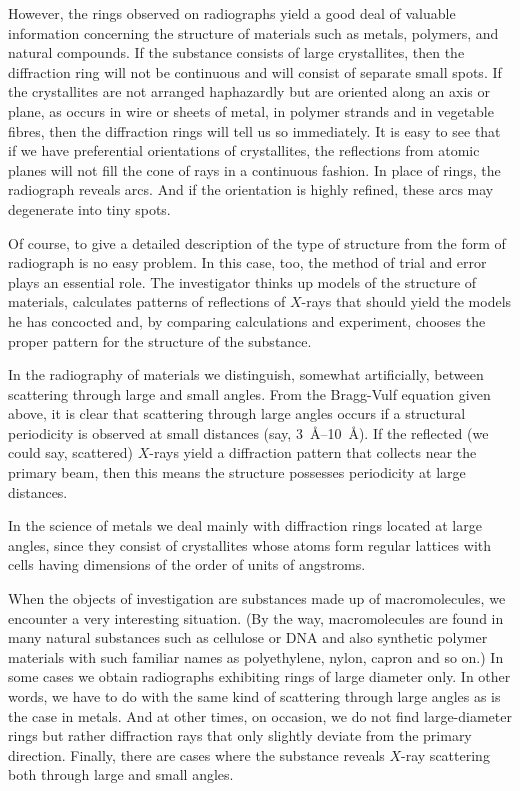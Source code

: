 However, the rings observed on radiographs yield a good deal of valuable information concerning the struc­ture of materials such as metals, polymers, and natural compounds. If the substance consists of large crystallites, then the diffraction ring will not be continuous and will consist of separate small spots. If the crystallites are not arranged haphazardly but are oriented along an axis or plane, as occurs in wire or sheets of metal, in polymer strands and in vegetable fibres, then the diffraction rings will tell us so immediately. It is easy to see that if we have preferential orientations of crystallites, the reflec­tions from atomic planes will not fill the cone of rays in a continuous fashion. In place of rings, the radiograph reveals arcs. And if the orientation is highly refined, these arcs may degenerate into tiny spots.

Of course, to give a detailed description of the type of structure from the form of radiograph is no easy prob­lem. In this case, too, the method of trial and error plays an essential role. The investigator thinks up models of the structure of materials, calculates patterns of reflec­tions of $X$-rays that should yield the models he has con­cocted and, by comparing calculations and experiment, chooses the proper pattern for the structure of the sub­stance.

In the radiography of materials we distinguish, some­what artificially, between scattering through large and small angles. From the Bragg-Vulf equation given above, it is clear that scattering through large angles occurs if a structural periodicity is observed at small distances (say, \SIrange{3}{10}{\angstrom}). If the reflected (we could say, scattered) $X$-rays yield a diffraction pattern that collects near the primary beam, then this means the structure possesses periodicity at large distances.

In the science of metals we deal mainly with diffrac­tion rings located at large angles, since they consist of crystallites whose atoms form regular lattices with cells having dimensions of the order of units of angstroms.

When the objects of investigation are substances made up of macromolecules, we encounter a very interesting situation. (By the way, macromolecules are found in many natural substances such as cellulose or DNA and also synthetic polymer materials with such familiar names as polyethylene, nylon, capron and so on.) In some cases we obtain radiographs exhibiting rings of large diameter only. In other words, we have to do with the same kind of scattering through large angles as is the case in metals. And at other times, on occasion, we do not find large-diameter rings but rather diffraction rays that only slightly deviate from the primary direction. Finally, there are cases where the substance reveals $X$-ray scattering both through large and small angles.

